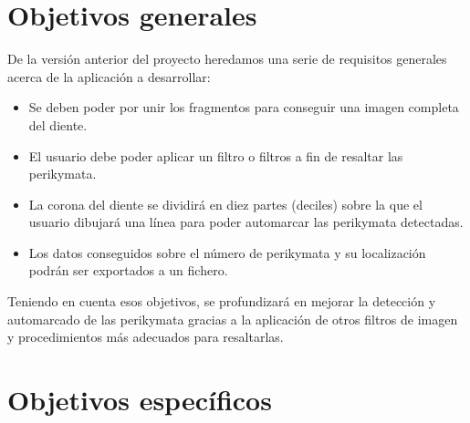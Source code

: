 
\begin{comment}
Este apartado explica de forma precisa y concisa cuales son los objetivos que se persiguen con la realización del proyecto. Se puede distinguir entre los objetivos marcados por los requisitos del software a construir y los objetivos de carácter técnico que plantea a la hora de llevar a la práctica el proyecto.
\end{comment}

\section{Objetivos generales}

De la versión anterior del proyecto \cite{perikymataV1} heredamos una serie de requisitos generales acerca de la aplicación a desarrollar:
\begin{itemize}
    \item Se deben poder por unir los fragmentos para conseguir una imagen completa del diente.
    \item El usuario debe poder aplicar un filtro o filtros a fin de resaltar las perikymata. 
    \item La corona del diente se dividirá en diez partes (deciles) sobre la que el usuario dibujará una línea para poder automarcar las perikymata detectadas.
    \item Los datos conseguidos sobre el número de perikymata y su localización podrán ser exportados a un fichero.
\end{itemize}

Teniendo en cuenta esos objetivos, se profundizará en mejorar la detección y automarcado de las perikymata gracias a la aplicación de otros filtros de imagen y procedimientos más adecuados para resaltarlas.

\newpage

\section{Objetivos específicos}


